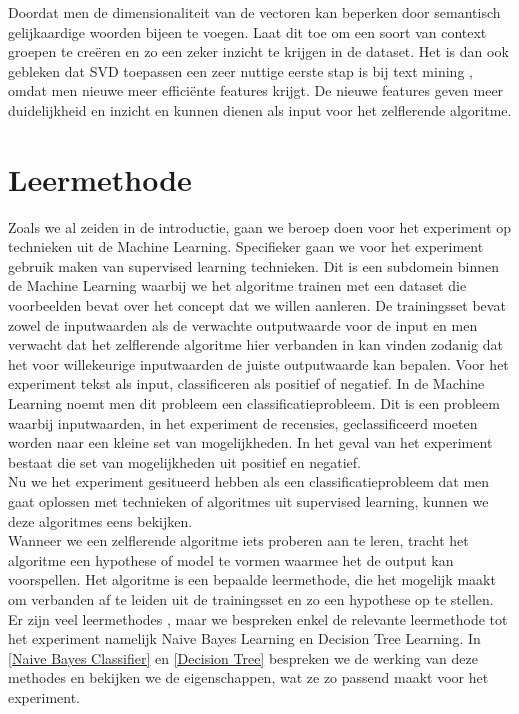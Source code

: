 Doordat men de dimensionaliteit van de vectoren kan beperken door semantisch gelijkaardige woorden bijeen te voegen. Laat dit toe om een soort van context groepen te cre\"eren en zo een zeker inzicht te krijgen in de dataset. Het is dan ook gebleken dat SVD toepassen een zeer nuttige eerste stap is bij text mining \cite{maas2011learning}, omdat men nieuwe meer effici\"ente features krijgt. De nieuwe features geven meer duidelijkheid en inzicht en kunnen dienen als input voor het zelflerende algoritme.

\section{Leermethode}\label{Leermethode}

Zoals we al zeiden in de introductie, gaan we beroep doen voor het experiment op technieken uit de Machine Learning. Specifieker gaan we voor het experiment gebruik maken van supervised learning technieken.
Dit is een subdomein binnen de Machine Learning waarbij we het algoritme trainen met een dataset die voorbeelden bevat over het concept dat we willen aanleren. De trainingsset bevat zowel de inputwaarden als de verwachte outputwaarde voor de input en men verwacht dat het zelflerende algoritme hier verbanden in kan vinden zodanig dat het voor willekeurige inputwaarden de juiste outputwaarde kan bepalen. Voor het experiment tekst als input, classificeren als positief of negatief. In de Machine Learning noemt men dit probleem een classificatieprobleem. Dit is een probleem waarbij inputwaarden, in het experiment de recensies, geclassificeerd moeten worden naar een kleine set van mogelijkheden. In het geval van het experiment bestaat die set van mogelijkheden uit positief en negatief.\\
%
Nu we het experiment gesitueerd hebben als een classificatieprobleem dat men gaat oplossen met technieken of algoritmes uit supervised learning, kunnen we deze algoritmes eens bekijken.\\  
%
Wanneer we een zelflerende algoritme iets proberen aan te leren, tracht het algoritme een hypothese of model te vormen waarmee het de output kan voorspellen. Het algoritme is een bepaalde leermethode, die het mogelijk maakt om verbanden af te leiden uit de trainingsset en zo een hypothese op te stellen.
Er zijn veel leermethodes \cite{mitchell1997machine}, maar we bespreken enkel de relevante leermethode tot het experiment namelijk Naive Bayes Learning en Decision Tree Learning. In \ref{Naive Bayes Classifier} en \ref{Decision Tree} bespreken we de werking van deze methodes en bekijken we de eigenschappen, wat ze zo passend maakt voor het experiment.  

